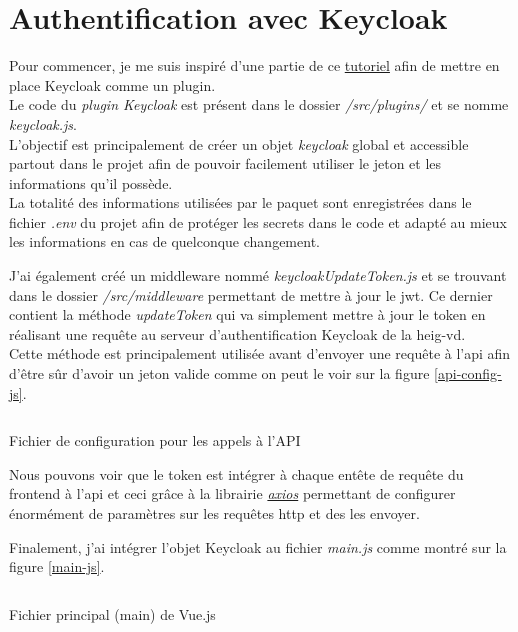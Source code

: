 \documentclass[
    iai, %
    il, %
]{heig-tb}
\begin{document}
\section{Authentification avec Keycloak}
Pour commencer, je me suis inspiré d'une partie de ce \href{https://davidtruxall.com/secure-a-vue-js-app-with-keycloak/}{tutoriel} afin de mettre en place Keycloak comme un plugin. \\
Le code du \emph{plugin Keycloak} est présent dans le dossier \emph{/src/plugins/} et se nomme \emph{keycloak.js}. \\
L'objectif est principalement de créer un objet \emph{keycloak} global et accessible partout dans le projet afin de pouvoir facilement utiliser le jeton et les informations qu'il possède. \\
La totalité des informations utilisées par le paquet sont enregistrées dans le fichier \emph{.env} du projet afin de protéger les secrets dans le code et adapté au mieux les informations en cas de quelconque changement.

J'ai également créé un middleware nommé \emph{keycloakUpdateToken.js} et se trouvant dans le dossier \emph{/src/middleware} permettant de mettre à jour le \Gls{jwt}. Ce dernier contient la méthode \emph{updateToken} qui va simplement mettre à jour le token en réalisant une requête au serveur d'authentification Keycloak de la \Gls{heig-vd}. \\
Cette méthode est principalement utilisée avant d'envoyer une requête à l'\Gls{api} afin d'être sûr d'avoir un jeton valide comme on peut le voir sur la figure \ref{api-config-js}. \\

\begin{listing}[h]
    \inputminted{js}{assets/code/apiConfig.js}
    \caption{Fichier de configuration pour les appels à l'API \label{api-config-js}}
\end{listing}

Nous pouvons voir que le token est intégrer à chaque entête de requête du \Gls{frontend} à l'\Gls{api} et ceci grâce à la librairie \href{https://axios-http.com/fr/docs/intro}{\emph{axios}} permettant de configurer énormément de paramètres sur les requêtes \Gls{http} et des les envoyer.

Finalement, j'ai intégrer l'objet Keycloak au fichier \emph{main.js} comme montré sur la figure \ref{main-js}.

\begin{listing}[h]
    \inputminted{js}{assets/code/main.js}
    \caption{Fichier principal (main) de Vue.js \label{main-js}}
\end{listing}
\end{document}
